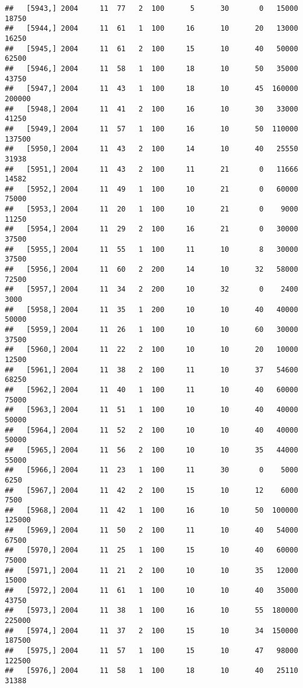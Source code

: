 \documentclass{article}\usepackage[]{graphicx}\usepackage[]{color}
\makeatletter
\newenvironment{kframe}{%
 \def\at@end@of@kframe{}%
 \ifinner\ifhmode%
  \def\at@end@of@kframe{\end{minipage}}%
  \begin{minipage}{\columnwidth}%
 \fi\fi%
 \def\FrameCommand##1{\hskip\@totalleftmargin \hskip-\fboxsep
 \colorbox{shadecolor}{##1}\hskip-\fboxsep
     \hskip-\linewidth \hskip-\@totalleftmargin \hskip\columnwidth}%
 \MakeFramed {\advance\hsize-\width
   \@totalleftmargin\z@ \linewidth\hsize
   \@setminipage}}%
 {\par\unskip\endMakeFramed%
 \at@end@of@kframe}
\newenvironment{knitrout}{}{} %
\makeatother
\begin{document}
\begin{knitrout}
\begin{kframe}
\begin{verbatim}
##   [5943,] 2004     11  77   2  100      5      30       0   15000   18750
##   [5944,] 2004     11  61   1  100     16      10      20   13000   16250
##   [5945,] 2004     11  61   2  100     15      10      40   50000   62500
##   [5946,] 2004     11  58   1  100     18      10      50   35000   43750
##   [5947,] 2004     11  43   1  100     18      10      45  160000  200000
##   [5948,] 2004     11  41   2  100     16      10      30   33000   41250
##   [5949,] 2004     11  57   1  100     16      10      50  110000  137500
##   [5950,] 2004     11  43   2  100     14      10      40   25550   31938
##   [5951,] 2004     11  43   2  100     11      21       0   11666   14582
##   [5952,] 2004     11  49   1  100     10      21       0   60000   75000
##   [5953,] 2004     11  20   1  100     10      21       0    9000   11250
##   [5954,] 2004     11  29   2  100     16      21       0   30000   37500
##   [5955,] 2004     11  55   1  100     11      10       8   30000   37500
##   [5956,] 2004     11  60   2  200     14      10      32   58000   72500
##   [5957,] 2004     11  34   2  200     10      32       0    2400    3000
##   [5958,] 2004     11  35   1  200     10      10      40   40000   50000
##   [5959,] 2004     11  26   1  100     10      10      60   30000   37500
##   [5960,] 2004     11  22   2  100     10      10      20   10000   12500
##   [5961,] 2004     11  38   2  100     11      10      37   54600   68250
##   [5962,] 2004     11  40   1  100     11      10      40   60000   75000
##   [5963,] 2004     11  51   1  100     10      10      40   40000   50000
##   [5964,] 2004     11  52   2  100     10      10      40   40000   50000
##   [5965,] 2004     11  56   2  100     10      10      35   44000   55000
##   [5966,] 2004     11  23   1  100     11      30       0    5000    6250
##   [5967,] 2004     11  42   2  100     15      10      12    6000    7500
##   [5968,] 2004     11  42   1  100     16      10      50  100000  125000
##   [5969,] 2004     11  50   2  100     11      10      40   54000   67500
##   [5970,] 2004     11  25   1  100     15      10      40   60000   75000
##   [5971,] 2004     11  21   2  100     10      10      35   12000   15000
##   [5972,] 2004     11  61   1  100     10      10      40   35000   43750
##   [5973,] 2004     11  38   1  100     16      10      55  180000  225000
##   [5974,] 2004     11  37   2  100     15      10      34  150000  187500
##   [5975,] 2004     11  57   1  100     15      10      47   98000  122500
##   [5976,] 2004     11  58   1  100     18      10      40   25110   31388

\end{verbatim}
\end{kframe}
\end{knitrout}
\end{document}
